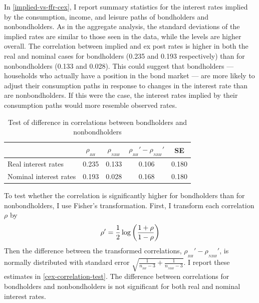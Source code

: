 In \autoref{implied-vs-ffr-cex}, I report summary statistics for the interest rates implied by the consumption, income, and leisure paths of bondholders and nonbondholders. As in the aggregate analysis, the standard deviations of the implied rates are similar to those seen in the data, while the levels are higher overall. The correlation between implied and ex post rates is higher in both the real and nominal cases for bondholders (0.235 and 0.193 respectively) than for nonbondholders (0.133 and 0.028). This could suggest that bondholders --- households who actually have a position in the bond market --- are more likely to adjust their consumption paths in response to changes in the interest rate than are nonbondholders. If this were the case, the interest rates implied by their consumption paths would more resemble observed rates.

\begin{table}[b]
\centering
\caption{Test of difference in correlations between bondholders and nonbondholders}
\label{cex-correlation-test}
\begin{tabular}{lcccc} \hline
& $\rho_{_{BH}}$ & $\rho_{_{NBH}}$ & $\rho_{_{BH}}' - \rho_{_{NBH}}'$ & SE \\ \hline
Real interest rates    & 0.235 & 0.133 & 0.106 & 0.180 \\
Nominal interest rates & 0.193 & 0.028 & 0.168 & 0.180 \\ \hline
\end{tabular}
\end{table}

To test whether the correlation is significantly higher for bondholders than for nonbondholders, I use Fisher's transformation. First, I transform each correlation $\rho$ by $$\rho' = \frac{1}{2} \log \left( \frac{1+\rho}{1-\rho} \right)$$
Then the difference between the transformed correlations, $\rho_{_{BH}}' - \rho_{_{NBH}}'$, is normally distributed with standard error $\sqrt{\frac{1}{n_{_{BH}} - 3} + \frac{1}{n_{_{NBH}} - 3}}$. I report these estimates in \autoref{cex-correlation-test}. The difference between correlations for bondholders and nonbondholders is not significant for both real and nominal interest rates.

